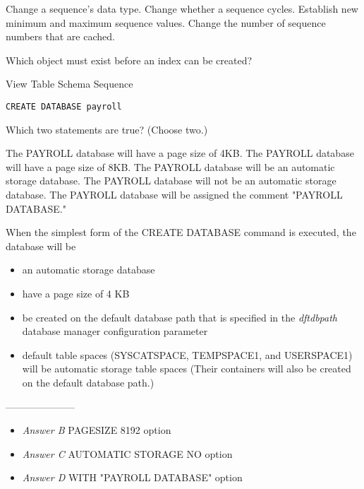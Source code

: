 \documentclass[answers, 11pt]{exam}
\begin{document}
\begin{questions}
\begin{choices}
	\CorrectChoice Change a sequence's data type.
	\choice Change whether a sequence cycles.
	\choice Establish new minimum and maximum sequence values.
	\choice Change the number of sequence numbers that are cached.
\end{choices}

\question[1]
Which object must exist before an index can be created?
\begin{choices}
	\choice View
	\CorrectChoice Table
	\choice Schema
	\choice Sequence
\end{choices}

\begin{verbatim}
CREATE DATABASE payroll
\end{verbatim}
Which two statements are true? (Choose two.)
\begin{choices}
	\CorrectChoice The PAYROLL database will have a page size of 4KB.
	\choice The PAYROLL database will have a page size of 8KB.
	\CorrectChoice The PAYROLL database will be an automatic storage database.
	\choice The PAYROLL database will not be an automatic storage database.
	\choice The PAYROLL database will be assigned the comment "PAYROLL DATABASE."
\end{choices}

\begin{solution}
When the simplest form of the CREATE DATABASE command is executed, the database will be
\begin{itemize}
	\item an automatic storage database
	\item have a page size of 4 KB
	\item be created on the default database path that is specified in the \textit{dftdbpath} database manager configuration parameter
	\item default table spaces (SYSCATSPACE, TEMPSPACE1, and USERSPACE1) will be automatic storage table spaces (Their containers will also be created on
	the default database path.)
\end{itemize}	
---------------------

\begin{itemize}
	\item \textit{Answer B} PAGESIZE 8192 option
	\item \textit{Answer C} AUTOMATIC STORAGE NO option
	\item \textit{Answer D} WITH "PAYROLL DATABASE" option 
\end{itemize}
\end{solution}


\end{questions}
\end{document}
